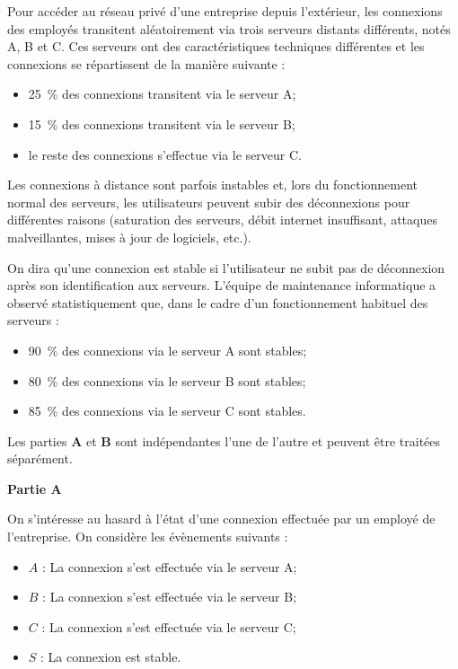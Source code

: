 \medskip
Pour accéder au réseau privé d'une entreprise depuis l'extérieur, les connexions des employés transitent aléatoirement via trois serveurs distants différents, notés A, B et C. Ces serveurs ont des caractéristiques techniques différentes et les connexions se répartissent de la manière suivante :

\begin{itemize}
\item 25~\% des connexions transitent via le serveur A;
\item 15~\% des connexions transitent via le serveur B;
\item le reste des connexions s'effectue via le serveur C.
\end{itemize}

\medskip

Les connexions à distance sont parfois instables et, lors du fonctionnement normal des serveurs, les utilisateurs peuvent subir des déconnexions pour différentes raisons (saturation des serveurs, débit internet insuffisant, attaques malveillantes, mises à jour de logiciels, etc.).

\medskip

On dira qu'une connexion est stable si l'utilisateur ne subit pas de déconnexion après son identification aux serveurs. L'équipe de maintenance informatique a observé statistiquement que, dans le cadre d'un fonctionnement habituel des serveurs :

\begin{itemize}
\item 90~\% des connexions via le serveur A sont stables;
\item 80~\% des connexions via le serveur B sont stables;
\item 85~\% des connexions via le serveur C sont stables.
\end{itemize}

Les parties \textbf{A} et \textbf{B} sont indépendantes l'une de l'autre et peuvent être traitées séparément.

\medskip

\textbf{Partie A}

\medskip

On s'intéresse au hasard à l'état d'une connexion effectuée par un employé de l'entreprise. On considère les évènements suivants :

\begin{itemize}
\item $A$ : \og La connexion s'est effectuée via le serveur A\fg{};
\item $B$ : \og La connexion s'est effectuée via le serveur B\fg{};
\item $C$ : \og La connexion s'est effectuée via le serveur C\fg{};
\item $S$ : \og La connexion est stable\fg.
\end{itemize}

